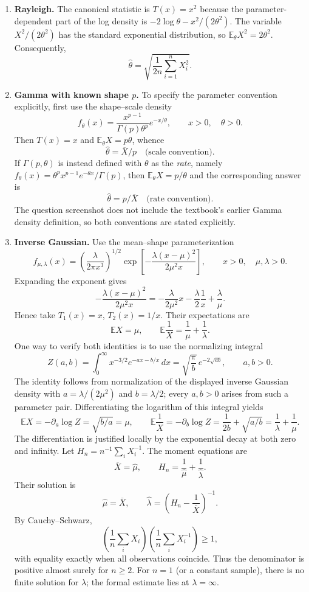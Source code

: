 \documentclass[lang=en,11pt,a4paper,citestyle=authoryear]{elegantpaper}
\newcommand{\E}{\mathbb{E}}
\begin{document}
\begin{enumerate}[label=(\alph*),leftmargin=*]
\begin{enumerate}[label=(\roman*),leftmargin=*]
\item \textbf{Rayleigh.}
The canonical statistic is $T(x)=x^2$ because the parameter-dependent
part of the log density is $-2\log\theta-x^2/(2\theta^2)$.
The variable $X^2/(2\theta^2)$ has the standard exponential
distribution, so $\E_\theta X^2=2\theta^2$.
Consequently,
\[
{\widehat\theta
=\sqrt{\frac1{2n}\sum_{i=1}^nX_i^2}.}
\]

\item \textbf{Gamma with known shape $p$.}
To specify the parameter convention explicitly, first use the
shape--scale density
\[
f_\theta(x)=\frac{x^{p-1}}{\Gamma(p)\theta^p}e^{-x/\theta},
\qquad x>0,\quad\theta>0.
\]
Then $T(x)=x$ and $\E_\theta X=p\theta$, whence
\[
{\widehat\theta=\overline X/p\quad\text{(scale convention)}.}
\]
If $\Gamma(p,\theta)$ is instead defined with $\theta$ as the
\emph{rate}, namely
$f_\theta(x)=\theta^p x^{p-1}e^{-\theta x}/\Gamma(p)$,
then $\E_\theta X=p/\theta$ and the corresponding answer is
\[
{\widehat\theta=p/\overline X\quad\text{(rate convention)}.}
\]
The question screenshot does not include the textbook's earlier
Gamma density definition, so both conventions are stated explicitly.

\item \textbf{Inverse Gaussian.}
Use the mean--shape parameterization
\[
f_{\mu,\lambda}(x)
=\left(\frac{\lambda}{2\pi x^3}\right)^{1/2}
\exp\left[-\frac{\lambda(x-\mu)^2}{2\mu^2x}\right],
\qquad x>0,\quad\mu,\lambda>0.
\]
Expanding the exponent gives
\[
-\frac{\lambda(x-\mu)^2}{2\mu^2x}
=-\frac{\lambda}{2\mu^2}x-\frac\lambda2\frac1x
+\frac\lambda\mu.
\]
Hence take $T_1(x)=x$, $T_2(x)=1/x$.
Their expectations are
\[
\E X=\mu,\qquad \E\frac1X=\frac1\mu+\frac1\lambda.
\]
One way to verify both identities is to use the normalizing integral
\[
Z(a,b)=\int_0^\infty x^{-3/2}e^{-ax-b/x}\,dx
=\sqrt{\frac\pi b}\,e^{-2\sqrt{ab}},\qquad a,b>0.
\]
The identity follows from normalization of the displayed inverse
Gaussian density with $a=\lambda/(2\mu^2)$ and $b=\lambda/2$;
every $a,b>0$ arises from such a parameter pair.
Differentiating the logarithm of this integral yields
\[
\E X=-\partial_a\log Z=\sqrt{b/a}=\mu,
\qquad
\E\frac1X=-\partial_b\log Z
=\frac1{2b}+\sqrt{a/b}=\frac1\lambda+\frac1\mu.
\]
The differentiation is justified locally by the exponential decay at
both zero and infinity.
Let $H_n=n^{-1}\sum_iX_i^{-1}$. The moment equations are
\[
\overline X=\widehat\mu,
\qquad H_n=\frac1{\widehat\mu}+\frac1{\widehat\lambda}.
\]
Their solution is
\[
{\widehat\mu=\overline X,\qquad
\widehat\lambda=\left(H_n-\frac1{\overline X}\right)^{-1}.}
\]
By Cauchy--Schwarz,
\[
\left(\frac1n\sum_iX_i\right)
\left(\frac1n\sum_iX_i^{-1}\right)\ge1,
\]
with equality exactly when all observations coincide. Thus the
denominator is positive almost surely for $n\ge2$.
For $n=1$ (or a constant sample), there is no finite solution for
$\lambda$; the formal estimate lies at $\lambda=\infty$.


\end{enumerate}
\end{enumerate}
\end{document}

